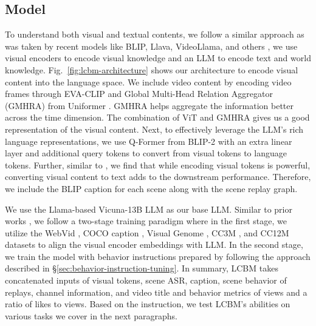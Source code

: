 \subsection{Model}
\label{sec:model}
To understand both visual and textual contents, we follow a similar approach as was taken by recent models like BLIP, Llava, VideoLlama, and others \cite{liu2023visual,ge2023planting,li2023blip2,zhu2023minigpt}, we use visual encoders to encode visual knowledge and an LLM to encode text and world knowledge. Fig.~\ref{fig:lcbm-architecture} shows our architecture to encode visual content into the language space. We include video content by encoding video frames through EVA-CLIP \cite{sun2023eva} and Global Multi-Head Relation Aggregator (GMHRA) from Uniformer \cite{li2021uniformer}. GMHRA helps aggregate the information better across the time dimension. The combination of ViT and GMHRA gives us a good representation of the visual content. Next, to effectively leverage the LLM’s rich language representations, we use Q-Former from BLIP-2 \cite{li2023blip2} with an extra linear layer and additional query tokens to convert from visual tokens to language tokens. Further, similar to \cite{bhattacharyya-etal-2023-video}, we find that while encoding visual tokens is powerful, converting visual content to text adds to the downstream performance. Therefore, we include the BLIP caption for each scene along with the scene replay graph. 


We use the Llama-based Vicuna-13B LLM \cite{touvron2023llama,vicuna2023} as our base LLM. Similar to prior works \cite{liu2023visual,ge2023planting,li2023blip2,zhu2023minigpt}, we follow a two-stage training paradigm where in the first stage, we utilize the WebVid \cite{bain2021frozen}, COCO caption \cite{chen2015microsoft}, Visual Genome \cite{krishna2017dense}, CC3M \cite{sharma2018conceptual}, and CC12M \cite{changpinyo2021conceptual} datasets to align the visual encoder embeddings with LLM. In the second stage, we train the model with behavior instructions prepared by following the approach described in \S\ref{sec:behavior-instruction-tuning}. In summary, LCBM takes concatenated inputs of visual tokens, scene ASR, caption, scene behavior of replays, channel information, and video title and behavior metrics of views and a ratio of likes to views. Based on the instruction, we test LCBM's abilities on various tasks we cover in the next paragraphs.



